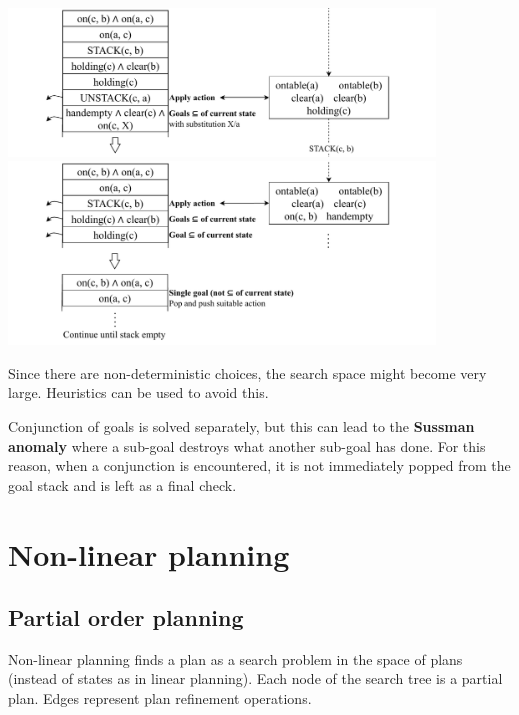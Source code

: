 \begin{example}
\begin{center}
        \includegraphics[width=0.85\textwidth]{img/_strips_example7.pdf}
        \includegraphics[width=0.85\textwidth]{img/_strips_example8.pdf}
    \end{center}
\end{example}

Since there are non-deterministic choices, the search space might become very large.
Heuristics can be used to avoid this.

Conjunction of goals is solved separately, but this can lead to the  \textbf{Sussman anomaly} 
where a sub-goal destroys what another sub-goal has done.
For this reason, when a conjunction is encountered, it is not immediately popped from the goal stack
and is left as a final check.



\section{Non-linear planning}


\subsection{Partial order planning}

Non-linear planning finds a plan as a search problem in the space of plans (instead of states as in linear planning).
Each node of the search tree is a partial plan. Edges represent plan refinement operations.

